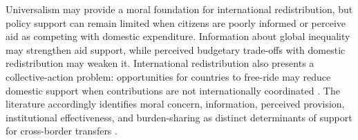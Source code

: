 \documentclass[11pt,a4paper]{article}
\begin{document}
Universalism may provide a moral foundation for international redistribution, but policy support can remain limited when citizens are poorly informed or perceive aid as competing with domestic expenditure. %
Information about global inequality may strengthen aid support, while perceived budgetary trade-offs with domestic redistribution may weaken it. International redistribution also presents a collective-action problem: opportunities for countries to free-ride may reduce domestic support when contributions are not internationally coordinated \citep{olson_1965}. %
The literature accordingly identifies moral concern, information, perceived provision, institutional effectiveness, and burden-sharing as distinct determinants of support for cross-border transfers \citep{cappelen_needs_2013,nair_misperceptions_2018,kaufmann_foreign_2019,gampfer_obtaining_2014}. %
\end{document}
